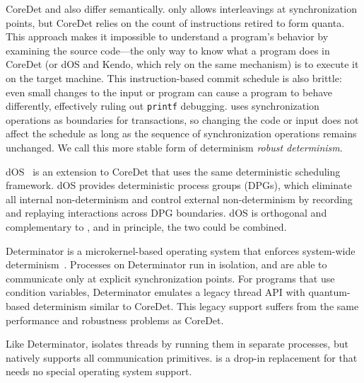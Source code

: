 CoreDet and \dthreads{} also differ semantically. \dthreads{}
only allows interleavings at synchronization points, but CoreDet relies on
the count of instructions retired to form quanta. This approach makes
it impossible to understand a program's behavior by examining the
source code---the only way to know what a program does in CoreDet (or
dOS and Kendo, which rely on the same mechanism) is to execute it on
the target machine. This instruction-based commit schedule is also
brittle: even small changes to the input or program can cause a
program to behave differently, effectively ruling out {\tt printf}
debugging. \dthreads{} uses synchronization operations as
boundaries for transactions, so changing the code or input does not
affect the schedule as long as the sequence of synchronization
operations remains unchanged.  We call this more stable form of determinism {\em robust determinism}.


dOS~\cite{deterministic-process-groups} is an extension to CoreDet
that uses the same deterministic scheduling framework.  dOS provides
deterministic process groups (DPGs), which eliminate all internal
non-determinism and control external non-determinism by recording and
replaying interactions across DPG boundaries. dOS is orthogonal and
complementary to \dthreads{}, and in principle, the two could be
combined.

Determinator is a microkernel-based operating system that enforces
system-wide determinism~\cite{efficient-system-enforced}.  Processes
on Determinator run in isolation, and are able to communicate only at
explicit synchronization points.  For programs that use condition variables,
Determinator emulates a legacy thread API with quantum-based determinism similar
to CoreDet.  This legacy support suffers from the same performance and robustness problems as CoreDet.

Like Determinator, \dthreads{} isolates threads by running them in separate processes, but natively supports all \pthreads{} communication primitives.  \dthreads{} is a drop-in replacement for \pthreads{} that needs no special operating system support.

